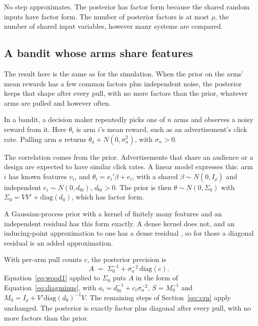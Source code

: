 \documentclass[11pt]{article}
\begin{document}
No step approximates. The posterior has factor form because the shared
random inputs have factor form. The number of posterior factors is at
most $\rho$, the number of shared input variables, however many
systems are compared.

\subsection{A bandit whose arms share features}
\label{sec:bandit-posterior}

The result here is the same as for the simulation. When the prior on
the arms' mean rewards has a few common factors plus independent
noise, the posterior keeps that shape after every pull, with no more
factors than the prior, whatever arms are pulled and however often.

In a bandit, a decision maker repeatedly picks one of $n$ arms and
observes a noisy reward from it. Here $\theta_i$ is arm $i$'s mean
reward, such as an advertisement's click rate. Pulling arm $a$ returns
$\theta_a + N(0, \sigma_n^2)$, with $\sigma_n > 0$.

The correlation comes from the prior. Advertisements that share an
audience or a design are expected to have similar click rates. A
linear model expresses this: arm $i$ has known features $v_i$, and
$\theta_i = v_i' \beta + e_i$, with a shared $\beta \sim N(0,
I_\rho)$ and independent $e_i \sim N(0, d_{0i})$, $d_{0i} > 0$. The
prior is then $\theta \sim N(0, \Sigma_0)$ with
$\Sigma_0 = V V' + \mathrm{diag}(d_0)$, which has factor form.

A Gaussian-process prior with a kernel of finitely many features and
an independent residual has this form exactly. A dense kernel does
not, and an inducing-point approximation to one has a dense residual
\citep{titsias2009}, so for those a diagonal residual is an added
approximation.

With per-arm pull counts $c$, the posterior precision is
\begin{equation}
A \;=\; \Sigma_0^{-1} + \sigma_n^{-2}\,\mathrm{diag}(c).
\end{equation}
Equation~\eqref{eq:wood1} applied to $\Sigma_0$ puts $A$ in the form
of Equation~\eqref{eq:diagminus}, with $a_i = d_{0i}^{-1} + c_i
\sigma_n^{-2}$, $S = M_0^{-1}$ and $M_0 = I_\rho + V'
\mathrm{diag}(d_0)^{-1} V$. The remaining steps of
Section~\ref{sec:crn} apply unchanged. The posterior is exactly
factor plus diagonal after every pull, with no more factors than the
prior.
\end{document}
